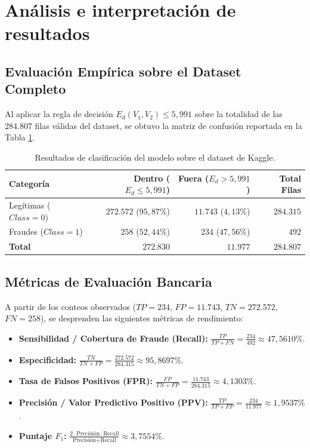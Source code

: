\documentclass[12pt,a4paper]{article}
\begin{document}
\section{Análisis e interpretación de resultados}

\subsection{Evaluación Empírica sobre el Dataset Completo}
Al aplicar la regla de decisión $E_d(V_1, V_2) \le 5{,}991$ sobre la totalidad de las $284.807$ filas válidas del dataset, se obtuvo la matriz de confusión reportada en la Tabla \ref{tab:clasificacion}.

\begin{table}[H]
\centering
\caption{Resultados de clasificación del modelo sobre el dataset de Kaggle.}
\label{tab:clasificacion}
\begin{tabular}{lrrr}
\toprule
\textbf{Categoría} & \textbf{Dentro ($E_d \le 5{,}991$)} & \textbf{Fuera ($E_d > 5{,}991$)} & \textbf{Total Filas} \\
\midrule
Legítimas ($Class = 0$) & $272.572$ ($95{,}87\%$) & $11.743$ ($4{,}13\%$) & $284.315$ \\
Fraudes ($Class = 1$) & $258$ ($52{,}44\%$) & $234$ ($47{,}56\%$) & $492$ \\
\midrule
\textbf{Total} & $272.830$ & $11.977$ & $284.807$ \\
\bottomrule
\end{tabular}
\end{table}

\subsection{Métricas de Evaluación Bancaria}
A partir de los conteos observados ($TP = 234$, $FP = 11.743$, $TN = 272.572$, $FN = 258$), se desprenden las siguientes métricas de rendimiento:
\begin{itemize}
    \item \textbf{Sensibilidad / Cobertura de Fraude (Recall):} $\frac{TP}{TP + FN} = \frac{234}{492} \approx 47{,}5610\%$.
    \item \textbf{Especificidad:} $\frac{TN}{TN + FP} = \frac{272.572}{284.315} \approx 95{,}8697\%$.
    \item \textbf{Tasa de Falsos Positivos (FPR):} $\frac{FP}{TN + FP} = \frac{11.743}{284.315} \approx 4{,}1303\%$.
    \item \textbf{Precisión / Valor Predictivo Positivo (PPV):} $\frac{TP}{TP + FP} = \frac{234}{11.977} \approx 1{,}9537\%$.
    \item \textbf{Puntaje $F_1$:} $\frac{2 \cdot \text{Precisión} \cdot \text{Recall}}{\text{Precisión} + \text{Recall}} \approx 3{,}7554\%$.
\end{itemize}
\end{document}
